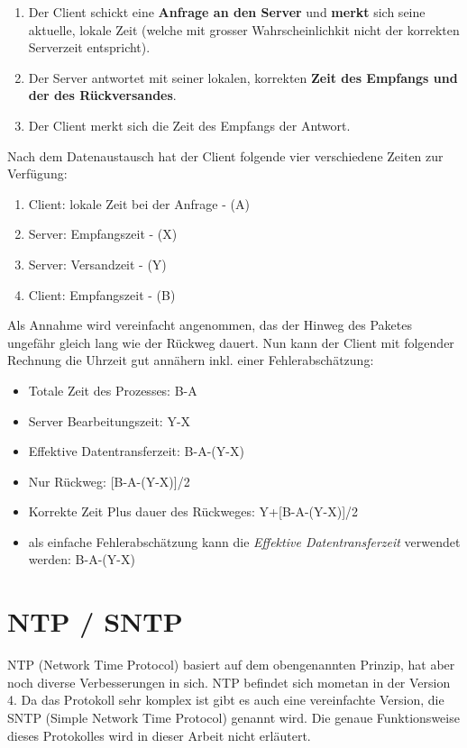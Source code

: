 \begin{enumerate}
\item Der Client schickt eine \textbf{Anfrage an den Server} und \textbf{merkt} sich seine aktuelle, lokale Zeit (welche mit grosser Wahrscheinlichkit nicht der korrekten Serverzeit entspricht).
\item Der Server antwortet mit seiner lokalen, korrekten \textbf{Zeit des Empfangs und der des Rückversandes}.
\item Der Client merkt sich die Zeit des Empfangs der Antwort. 
\end{enumerate}
\vspace{1em}
Nach dem Datenaustausch hat der Client folgende vier verschiedene Zeiten zur Verfügung:
\begin{enumerate}
\item Client: lokale Zeit bei der Anfrage - (A)
\item Server: Empfangszeit - (X)
\item Server: Versandzeit - (Y)
\item Client: Empfangszeit - (B)
\end{enumerate}
\vspace{1em}
Als Annahme wird vereinfacht angenommen, das der Hinweg des Paketes ungefähr gleich lang wie der Rückweg dauert.
\vspace{1em}
Nun kann der Client mit folgender Rechnung die Uhrzeit gut annähern inkl. einer Fehlerabschätzung:
\begin{itemize}
\item Totale Zeit des Prozesses: B-A
\item Server Bearbeitungszeit: Y-X
\item Effektive Datentransferzeit: B-A-(Y-X)
\item Nur Rückweg: [B-A-(Y-X)]/2
\item Korrekte Zeit Plus dauer des Rückweges: Y+[B-A-(Y-X)]/2
\item als einfache Fehlerabschätzung kann die \textit{Effektive Datentransferzeit} verwendet werden: B-A-(Y-X)
\end{itemize}



\section{NTP / SNTP}
NTP (Network Time Protocol) basiert auf dem obengenannten Prinzip, hat aber noch diverse Verbesserungen in sich.
NTP befindet sich mometan in der Version 4.
Da das Protokoll sehr komplex ist gibt es auch eine vereinfachte Version, die SNTP (Simple Network Time Protocol) genannt wird.
Die genaue Funktionsweise dieses Protokolles wird in dieser Arbeit nicht erläutert.

